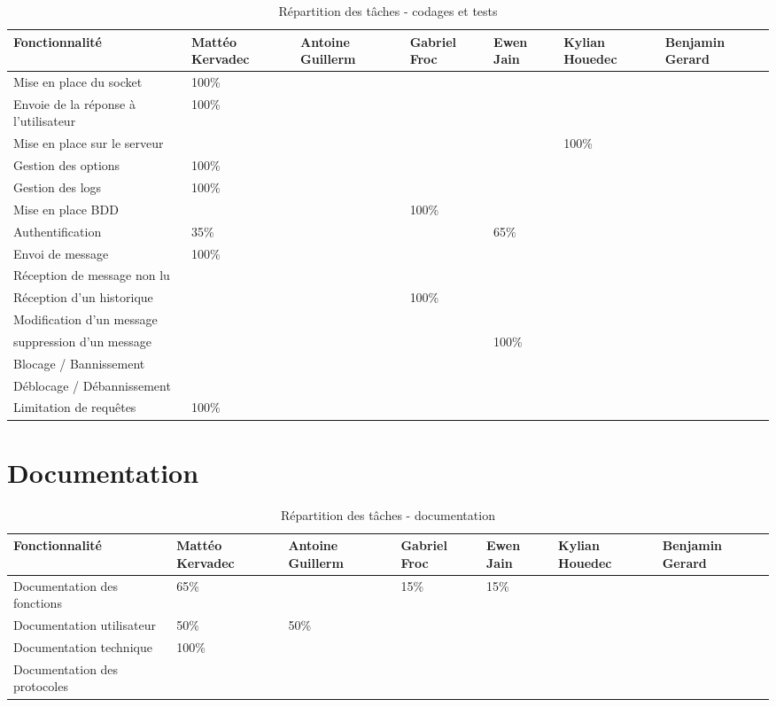 \documentclass{report}
\begin{document}
\begin{table}[ht]
\hspace{-1cm}  %
\begin{tabular}{|p{3cm}|p{2cm}|p{2cm}|p{2cm}|p{2cm}|p{2cm}|p{2cm}|}
\hline
\textbf{Fonctionnalité} & \textbf{Mattéo Kervadec} & \textbf{Antoine Guillerm} & \textbf{Gabriel Froc} & \textbf{Ewen Jain} & \textbf{Kylian Houedec} & \textbf{Benjamin Gerard} \\
\hline
Mise en place du socket & 100\% & & & & & \\
\hline
Envoie de la réponse à l'utilisateur & 100\% & & & & & \\
\hline
Mise en place sur le serveur & & & & & 100\% & \\
\hline
Gestion des options & 100\% & & & & & \\
\hline
Gestion des logs & 100\% & & & & & \\
\hline
Mise en place BDD & & & 100\% & & & \\
\hline
Authentification & 35\% & & & 65\% & & \\
\hline
Envoi de message & 100\% & & & & & \\
\hline
Réception de message non lu & & & & & & \\
\hline
Réception d'un historique & & & 100\% & & & \\
\hline
Modification d'un message & & & & & & \\
\hline
suppression d'un message & & & & 100\% & & \\
\hline
Blocage / Bannissement & & & & & & \\
\hline
Déblocage / Débannissement &  & & & & & \\
\hline
Limitation de requêtes & 100\% & & & & & \\
\hline
\end{tabular}
\caption{Répartition des tâches - codages et tests}
\end{table}

\chapter{Documentation}

\begin{table}[ht]
\hspace{-1cm}  %
\begin{tabular}{|p{3cm}|p{2cm}|p{2cm}|p{2cm}|p{2cm}|p{2cm}|p{2cm}|}
\hline
\textbf{Fonctionnalité} & \textbf{Mattéo Kervadec} & \textbf{Antoine Guillerm} & \textbf{Gabriel Froc} & \textbf{Ewen Jain} & \textbf{Kylian Houedec} & \textbf{Benjamin Gerard} \\
\hline
Documentation des fonctions & 65\% & & 15\% & 15\% & & \\
\hline
Documentation utilisateur & 50\% & 50\% & & & & \\
\hline
Documentation technique & 100\% & & & & & \\
\hline
Documentation des protocoles & & & & & & \\
\hline
\end{tabular}
\caption{Répartition des tâches - documentation}
\end{table}
\end{document}
